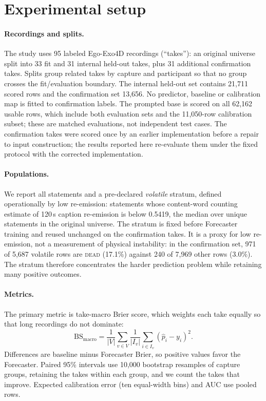 \documentclass[10pt]{article}
\newcommand{\dead}{\textsc{dead}}
\begin{document}
\section{Experimental setup}
\label{sec:setup}

\paragraph{Recordings and splits.} The study uses 95 labeled Ego-Exo4D recordings (``takes''): an original universe split into 33 fit and 31 internal held-out takes, plus 31 additional confirmation takes. Splits group related takes by capture and participant so that no group crosses the fit/evaluation boundary. The internal held-out set contains 21,711 scored rows and the confirmation set 13,656. No predictor, baseline or calibration map is fitted to confirmation labels. The prompted base is scored on all 62,162 usable rows, which include both evaluation sets and the 11,050-row calibration subset; these are matched evaluations, not independent test cases. The confirmation takes were scored once by an earlier implementation before a repair to input construction; the results reported here re-evaluate them under the fixed protocol with the corrected implementation.

\paragraph{Populations.} We report all statements and a pre-declared \emph{volatile} stratum, defined operationally by low re-emission: statements whose content-word counting estimate of 120\,s caption re-emission is below 0.5419, the median over unique statements in the original universe. The stratum is fixed before Forecaster training and reused unchanged on the confirmation takes. It is a proxy for low re-emission, not a measurement of physical instability: in the confirmation set, 971 of 5,687 volatile rows are \dead{} (17.1\%) against 240 of 7,969 other rows (3.0\%). The stratum therefore concentrates the harder prediction problem while retaining many positive outcomes.

\paragraph{Metrics.} The primary metric is take-macro Brier score, which weights each take equally so that long recordings do not dominate:
\begin{equation}
\mathrm{BS}_{\text{macro}} = \frac{1}{|V|}\sum_{v\in V}\frac{1}{|I_v|}\sum_{i\in I_v}(\hat p_i - y_i)^2 .
\end{equation}
Differences are baseline minus Forecaster Brier, so positive values favor the Forecaster. Paired 95\% intervals use 10,000 bootstrap resamples of capture groups, retaining the takes within each group, and we count the takes that improve. Expected calibration error (ten equal-width bins) and AUC use pooled rows.
\end{document}
